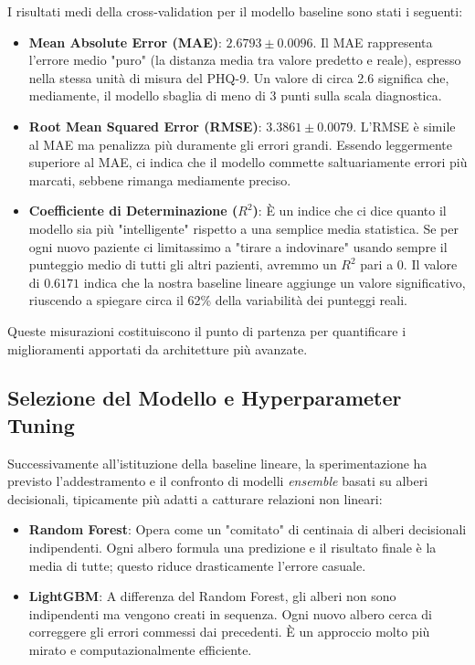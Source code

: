 I risultati medi della cross-validation per il modello baseline sono stati i seguenti:
\begin{itemize}
    \item \textbf{Mean Absolute Error (MAE)}: $2.6793 \pm 0.0096$. Il MAE rappresenta l'errore medio "puro" (la distanza media tra valore predetto e reale), espresso nella stessa unità di misura del PHQ-9. Un valore di circa 2.6 significa che, mediamente, il modello sbaglia di meno di 3 punti sulla scala diagnostica.
    \item \textbf{Root Mean Squared Error (RMSE)}: $3.3861 \pm 0.0079$. L'RMSE è simile al MAE ma penalizza più duramente gli errori grandi. Essendo leggermente superiore al MAE, ci indica che il modello commette saltuariamente errori più marcati, sebbene rimanga mediamente preciso.
    \item \textbf{Coefficiente di Determinazione ($R^2$)}: È un indice che ci dice quanto il modello sia più "intelligente" rispetto a una semplice media statistica. Se per ogni nuovo paziente ci limitassimo a "tirare a indovinare" usando sempre il punteggio medio di tutti gli altri pazienti, avremmo un $R^2$ pari a 0. Il valore di $0.6171$ indica che la nostra baseline lineare aggiunge un valore significativo, riuscendo a spiegare circa il 62\% della variabilità dei punteggi reali.
\end{itemize}

Queste misurazioni costituiscono il punto di partenza per quantificare i miglioramenti apportati da architetture più avanzate.

\subsection{Selezione del Modello e Hyperparameter Tuning}

Successivamente all'istituzione della baseline lineare, la sperimentazione ha previsto l'addestramento e il confronto di modelli \textit{ensemble} basati su alberi decisionali, tipicamente più adatti a catturare relazioni non lineari:
\begin{itemize}
    \item \textbf{Random Forest}: Opera come un "comitato" di centinaia di alberi decisionali indipendenti. Ogni albero formula una predizione e il risultato finale è la media di tutte; questo riduce drasticamente l'errore casuale.
    \item \textbf{LightGBM}: A differenza del Random Forest, gli alberi non sono indipendenti ma vengono creati in sequenza. Ogni nuovo albero cerca di correggere gli errori commessi dai precedenti. È un approccio molto più mirato e computazionalmente efficiente.
\end{itemize}

